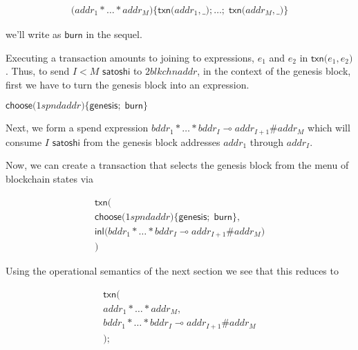\documentclass[]{acm_proc_article-sp}
\numberwithin{equation}{subsection}
\begin{document}
\begin{equation*}
  \begin{aligned} 
    \mathsf{(} addr_1 * \ldots * addr_M {)} \mathsf{\{} \mathsf{txn}\mathsf{(} addr_1, \mathsf{\_} \mathsf{)} \mathsf{;} \ldots \mathsf{;} \; \mathsf{txn}\mathsf{(}addr_M, \mathsf{\_} \mathsf{)} \mathsf{\}}
  \end{aligned} 
\end{equation*}

we'll write as $\mathsf{burn}$ in the sequel.

Executing a transaction amounts to joining to expressions, $e_1$ and
$e_2$ in $\mathsf{txn}\mathsf{(} e_1, e_2\mathsf{)}$. Thus, to send
$I < M$ $\mathsf{satoshi}$ to $2blkchnaddr$, in the context of the genesis
block, first we have to turn the genesis block into an expression.

$\mathsf{choose}\mathsf{(} 1spndaddr \mathsf{)}\mathsf{\{} \mathsf{genesis}\mathsf{;}\; \mathsf{burn} \mathsf{\}}$

Next, we form a spend expression $bddr_1 * \ldots * bddr_I \multimap addr_{I+1} \# addr_M$ which will consume $I$ $\mathsf{satoshi}$ from the genesis block addresses $addr_1$ through $addr_I$.

Now, we can create a transaction that selects the genesis block from
the menu of blockchain states via

\begin{equation*}
  \begin{aligned} 
    \mathsf{txn}\mathsf{(} \\
    \mathsf{choose}\mathsf{(} 1spndaddr \mathsf{)}\mathsf{\{} \mathsf{genesis}\mathsf{;}\; \mathsf{burn} \mathsf{\}}, \\
    \mathsf{inl}\mathsf{(} bddr_1 * \ldots * bddr_I \multimap addr_{I+1} \# addr_M \mathsf{)} \\
    \mathsf{)}
  \end{aligned}   
\end{equation*}

Using the operational semantics of the next section we see that this reduces to

\begin{equation*}
  \begin{aligned} 
    \mathsf{txn}\mathsf{(} \\
    addr_1 * \ldots * addr_M, \\
    bddr_1 * \ldots * bddr_I \multimap addr_{I+1} \# addr_M \\
    \mathsf{)} \mathsf{;}
  \end{aligned} 
\end{equation*}
\end{document}
